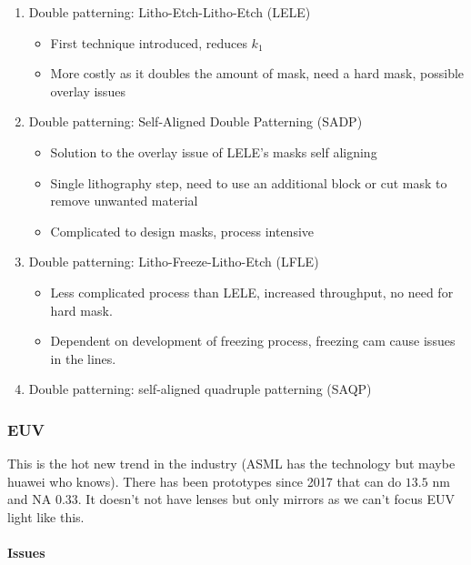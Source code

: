 \documentclass[
]{article}
\begin{document}
\begin{enumerate}
\def\labelenumi{\arabic{enumi}.}
\item
  Double patterning: Litho-Etch-Litho-Etch (LELE)

  \begin{itemize}
  \item
    First technique introduced, reduces \(k_1\)
  \item
    More costly as it doubles the amount of mask, need a hard mask,
    possible overlay issues
  \end{itemize}
\item
  Double patterning: Self-Aligned Double Patterning (SADP)

  \begin{itemize}
  \item
    Solution to the overlay issue of LELE's masks self aligning
  \item
    Single lithography step, need to use an additional block or cut mask
    to remove unwanted material
  \item
    Complicated to design masks, process intensive
  \end{itemize}
\item
  Double patterning: Litho-Freeze-Litho-Etch (LFLE)

  \begin{itemize}
  \item
    Less complicated process than LELE, increased throughput, no need
    for hard mask.
  \item
    Dependent on development of freezing process, freezing cam cause
    issues in the lines.
  \end{itemize}
\item
  Double patterning: self-aligned quadruple patterning (SAQP)
\end{enumerate}

\hypertarget{euv}{%
\subsubsection{EUV}\label{euv}}

This is the hot new trend in the industry (ASML has the technology but
maybe huawei who knows). There has been prototypes since 2017 that can
do \(13.5\) nm and NA \(0.33\). It doesn't not have lenses but only
mirrors as we can't focus EUV light like this.

\hypertarget{issues}{%
\paragraph{Issues}\label{issues}}
\end{document}
